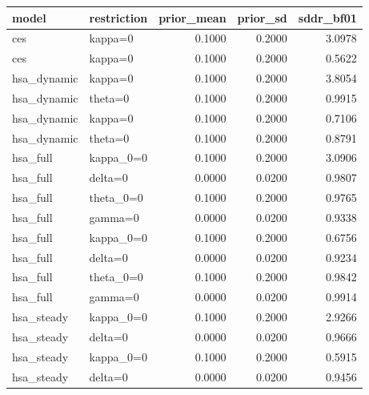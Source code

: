 \begin{tabular}{llrrr}
\toprule
model & restriction & prior\_mean & prior\_sd & sddr\_bf01 \\
\midrule
ces & kappa=0 & 0.1000 & 0.2000 & 3.0978 \\
ces & kappa=0 & 0.1000 & 0.2000 & 0.5622 \\
hsa\_dynamic & kappa=0 & 0.1000 & 0.2000 & 3.8054 \\
hsa\_dynamic & theta=0 & 0.1000 & 0.2000 & 0.9915 \\
hsa\_dynamic & kappa=0 & 0.1000 & 0.2000 & 0.7106 \\
hsa\_dynamic & theta=0 & 0.1000 & 0.2000 & 0.8791 \\
hsa\_full & kappa\_0=0 & 0.1000 & 0.2000 & 3.0906 \\
hsa\_full & delta=0 & 0.0000 & 0.0200 & 0.9807 \\
hsa\_full & theta\_0=0 & 0.1000 & 0.2000 & 0.9765 \\
hsa\_full & gamma=0 & 0.0000 & 0.0200 & 0.9338 \\
hsa\_full & kappa\_0=0 & 0.1000 & 0.2000 & 0.6756 \\
hsa\_full & delta=0 & 0.0000 & 0.0200 & 0.9234 \\
hsa\_full & theta\_0=0 & 0.1000 & 0.2000 & 0.9842 \\
hsa\_full & gamma=0 & 0.0000 & 0.0200 & 0.9914 \\
hsa\_steady & kappa\_0=0 & 0.1000 & 0.2000 & 2.9266 \\
hsa\_steady & delta=0 & 0.0000 & 0.0200 & 0.9666 \\
hsa\_steady & kappa\_0=0 & 0.1000 & 0.2000 & 0.5915 \\
hsa\_steady & delta=0 & 0.0000 & 0.0200 & 0.9456 \\
\bottomrule
\end{tabular}
